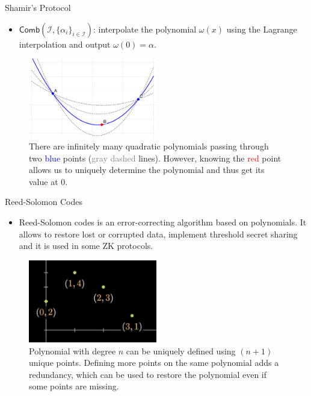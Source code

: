 \documentclass{beamer}
\begin{document}
    \begin{frame}{Shamir's Protocol}
      \begin{definition}
        \begin{itemize}
            \item $\mathsf{Comb}(\mathcal{I}, \{\alpha_i\}_{i \in \mathcal{I}})$: interpolate the polynomial $\omega(x)$ using the Lagrange interpolation and output $\omega(0) = \alpha$.
        \end{itemize}
      \end{definition}

      \begin{figure}
        \centering
        \includegraphics[width=0.5\textwidth]{images/lecture_1/shamir_demo.pdf}
        \caption{There are infinitely many quadratic polynomials passing through two \textcolor{blue}{blue} points (\textcolor{gray}{gray dashed} lines). However, knowing the \textcolor{red}{red} point allows us to uniquely determine the polynomial and thus get its value at $0$.}
        \label{fig:shamir}
      \end{figure}
    \end{frame}

    \begin{frame}{Reed-Solomon Codes}
        \begin{definition}
            \begin{itemize}
                \item Reed-Solomon codes is an error-correcting algorithm based on polynomials. It allows to restore lost or corrupted data, implement threshold secret sharing and it is used in some ZK protocols.
            \end{itemize}
          \end{definition}
  
        \begin{figure}
          \centering
          \includegraphics[width=0.5\textwidth]{images/lecture_2/reed-solomon-1.png}
          \caption{Polynomial with degree $n$ can be uniquely defined using $(n+1)$ unique points. Defining more points on the same polynomial adds a redundancy, which can be used to restore the polynomial even if some points are missing.}
          \label{fig:reed-1}
        \end{figure}
    \end{frame}
\end{document}
